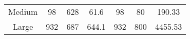 \documentclass[letterpaper,twocolumn,10pt]{article}
\begin{document}
\begin{table*}[t]
\begin{tabular}{|ccccccc|}
\multicolumn{1}{|c|}{Medium} & \multicolumn{1}{c|}{98}                                                         & \multicolumn{1}{c|}{628}                                                                  & \multicolumn{1}{c|}{61.6}                                                                     & \multicolumn{1}{c|}{98}                                                           & \multicolumn{1}{c|}{80}                                                            & 190.33                                                                      \\
\multicolumn{1}{|c|}{Large}  & \multicolumn{1}{c|}{932}                                                        & \multicolumn{1}{c|}{687}                                                                  & \multicolumn{1}{c|}{644.1}                                                                    & \multicolumn{1}{c|}{932}                                                          & \multicolumn{1}{c|}{800}                                                           & 4455.53                                                                     \\ \hline
\end{tabular}
\end{table*}










\end{document}
